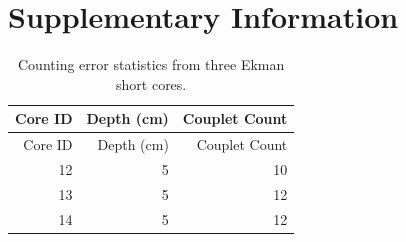 \documentclass[Royal,times,doublespace,sageh]{sagej}
\begin{document}
\pagebreak

\hypertarget{supplementary-information}{%
\section{Supplementary Information}\label{supplementary-information}}

\begin{longtable}[]{@{}rrr@{}}
\caption{Counting error statistics from three Ekman short cores.
\label{tab:ekErr}}\tabularnewline
\toprule()
Core ID & Depth (cm) & Couplet Count \\
\midrule()
\endfirsthead
\toprule()
Core ID & Depth (cm) & Couplet Count \\
\midrule()
\endhead
12 & 5 & 10 \\
13 & 5 & 12 \\
14 & 5 & 12 \\
\bottomrule()
\end{longtable}



\end{document}
